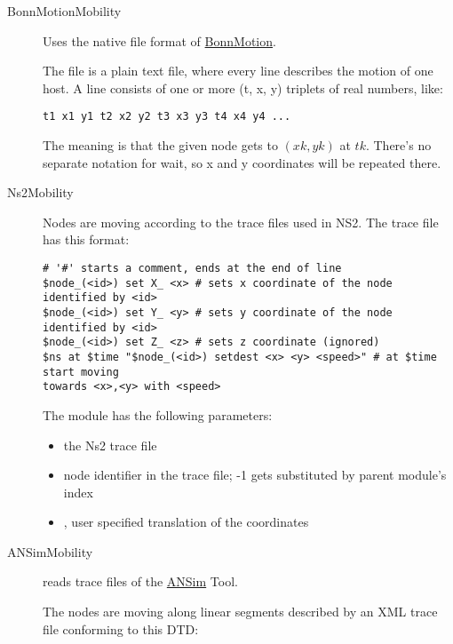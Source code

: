 \begin{description}

\item[BonnMotionMobility] Uses the native file format of
\href{http://www.cs.uni-bonn.de/IV/BonnMotion/}{BonnMotion}.

The file is a plain text file, where every line describes the motion
of one host. A line consists of one or more (t, x, y) triplets of real
numbers, like:

\begin{verbatim}
t1 x1 y1 t2 x2 y2 t3 x3 y3 t4 x4 y4 ...
\end{verbatim}

The meaning is that the given node gets to $(xk,yk)$ at $tk$. There's no
separate notation for wait, so x and y coordinates will be repeated there.

\item[Ns2Mobility] Nodes are moving according to the trace files used
in NS2.
The trace file has this format:

\begin{verbatim}
# '#' starts a comment, ends at the end of line
$node_(<id>) set X_ <x> # sets x coordinate of the node identified by <id>
$node_(<id>) set Y_ <y> # sets y coordinate of the node identified by <id>
$node_(<id>) set Z_ <z> # sets z coordinate (ignored)
$ns at $time "$node_(<id>) setdest <x> <y> <speed>" # at $time start moving
towards <x>,<y> with <speed>
\end{verbatim}

The  module has the following parameters:

\begin{itemize}
  \item {} the Ns2 trace file
  \item {} node identifier in the trace file; -1 gets substituted by
  parent module's index
  \item {}, user specified translation of the
  coordinates
\end{itemize}


\item[ANSimMobility] reads trace files of the \href{http://www.ansim.info}{ANSim} Tool.

The nodes are moving along linear segments described by an XML trace file
conforming to this DTD:


\end{description}
